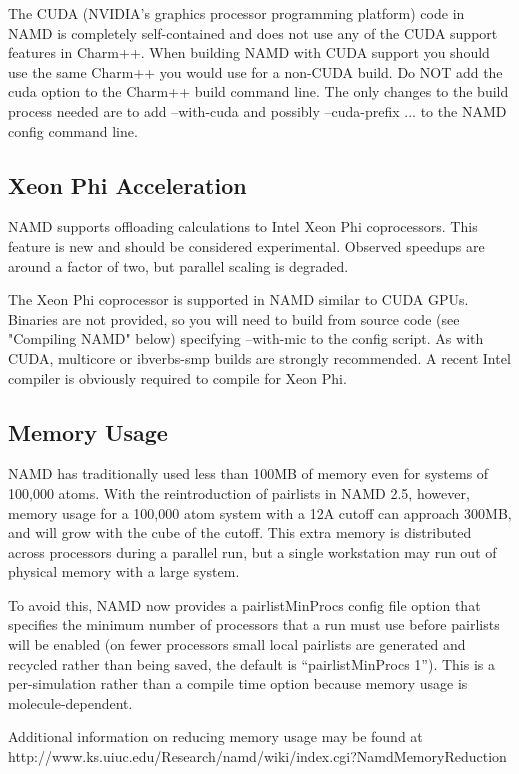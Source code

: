 The CUDA (NVIDIA's graphics processor programming platform) code in
NAMD is completely self-contained and does not use any of the CUDA
support features in Charm++.  When building NAMD with CUDA support
you should use the same Charm++ you would use for a non-CUDA build.
Do NOT add the cuda option to the Charm++ build command line.  The
only changes to the build process needed are to add --with-cuda and
possibly --cuda-prefix ... to the NAMD config command line.

\subsection{Xeon Phi Acceleration}

NAMD supports offloading calculations to Intel Xeon Phi coprocessors.
This feature is new and should be considered experimental.  Observed
speedups are around a factor of two, but parallel scaling is degraded.

The Xeon Phi coprocessor is supported in NAMD similar to CUDA GPUs.
Binaries are not provided, so you will need to build from source code
(see "Compiling NAMD" below) specifying --with-mic to the config script.
As with CUDA, multicore or ibverbs-smp builds are strongly recommended.
A recent Intel compiler is obviously required to compile for Xeon Phi.

\subsection{Memory Usage}

NAMD has traditionally used less than 100MB of memory even for systems
of 100,000 atoms.  With the reintroduction of pairlists in NAMD 2.5,
however, memory usage for a 100,000 atom system with a 12A cutoff can
approach 300MB, and will grow with the cube of the cutoff.  This extra
memory is distributed across processors during a parallel run, but a
single workstation may run out of physical memory with a large system.

To avoid this, NAMD now provides a pairlistMinProcs config file option
that specifies the minimum number of processors that a run must use
before pairlists will be enabled (on fewer processors small local
pairlists are generated and recycled rather than being saved, the
default is ``pairlistMinProcs 1'').  This is a per-simulation rather than
a compile time option because memory usage is molecule-dependent.

Additional information on reducing memory usage may be found at
http://www.ks.uiuc.edu/Research/namd/wiki/index.cgi?NamdMemoryReduction

